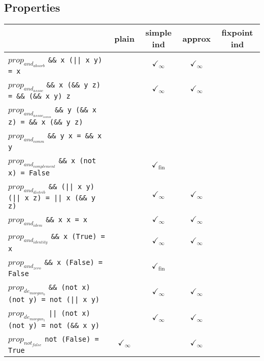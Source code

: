 \documentclass{article}
\begin{document}
\subsection*{Properties}
\begin{longtable}{p{10cm} || c | c | c | c | }
  & plain & simple ind & approx & fixpoint ind \\
\hline
$prop_{and_{absorb}}$ \newline \verb`&& x (|| x y) = x` &  & $\checkmark_{\infty}$ & $\checkmark_{\infty}$ &  \\
\hline
$prop_{and_{assoc}}$ \newline \verb`&& x (&& y z) = && (&& x y) z` &  & $\checkmark_{\infty}$ & $\checkmark_{\infty}$ &  \\
\hline
$prop_{and_{assoc_{comm}}}$ \newline \verb`&& y (&& x z) = && x (&& y z)` &  &  &  &  \\
\hline
$prop_{and_{comm}}$ \newline \verb`&& y x = && x y` &  &  &  &  \\
\hline
$prop_{and_{complement}}$ \newline \verb`&& x (not x) = False` &  & $\checkmark_{\mathrm{fin}}$ &  &  \\
\hline
$prop_{and_{distrib}}$ \newline \verb`&& (|| x y) (|| x z) = || x (&& y z)` &  & $\checkmark_{\infty}$ & $\checkmark_{\infty}$ &  \\
\hline
$prop_{and_{idem}}$ \newline \verb`&& x x = x` &  & $\checkmark_{\infty}$ & $\checkmark_{\infty}$ &  \\
\hline
$prop_{and_{identity}}$ \newline \verb`&& x (True) = x` &  & $\checkmark_{\infty}$ & $\checkmark_{\infty}$ &  \\
\hline
$prop_{and_{zero}}$ \newline \verb`&& x (False) = False` &  & $\checkmark_{\mathrm{fin}}$ &  &  \\
\hline
$prop_{de_{morgan_{0}}}$ \newline \verb`&& (not x) (not y) = not (|| x y)` &  & $\checkmark_{\infty}$ & $\checkmark_{\infty}$ &  \\
\hline
$prop_{de_{morgan_{1}}}$ \newline \verb`|| (not x) (not y) = not (&& x y)` &  & $\checkmark_{\infty}$ & $\checkmark_{\infty}$ &  \\
\hline
$prop_{not_{false}}$ \newline \verb`not (False) = True` & $\checkmark_{\infty}$ &  & $\checkmark_{\infty}$ &  \\

\end{longtable}
\end{document}
